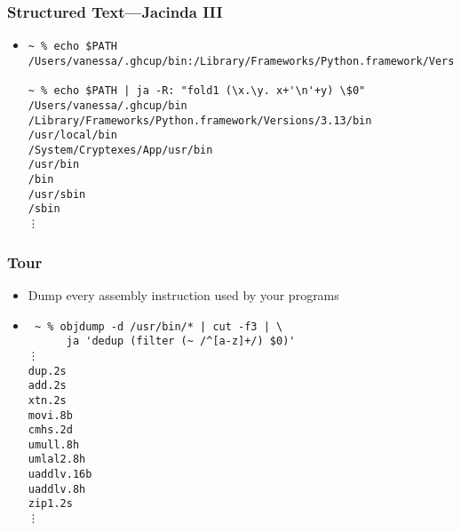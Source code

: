 \documentclass{beamer}
\begin{document}
\begin{frame}[fragile]
  \frametitle{Structured Text---Jacinda III}
  \begin{itemize}
    \item
      \begin{verbatim}
~ % echo $PATH
/Users/vanessa/.ghcup/bin:/Library/Frameworks/Python.framework/Versions/3.13/bin:/Library/Frameworks/Python.framework/Versions/3.12/bin:/Library/Frameworks/Python.framework/Versions/3.11/bin:/Library/Frameworks/Python.framework/Versions/3.10/bin:/usr/local/bin:/System/Cryptexes/App/usr/bin:/usr/bin:/bin:/usr/sbin:/sbin:/var/run/com.apple.security.cryptexd/codex.system/bootstrap/usr/local/bin:/var/run/com.apple.security.cryptexd/codex.system/bootstrap/usr/bin:/var/run/com.apple.security.cryptexd/codex.system/bootstrap/usr/appleinternal/bin:/opt/X11/bin:/Library/TeX/texbin:/usr/local/go/bin:/Users/vanessa/.cpm/bin:/Users/vanessa/pakcs/bin:/Users/vanessa/.local/bin:/Users/vanessa/.cargo/bin:/Applications/iTerm.app/Contents/Resources/utilities:/Applications/CMake.app/Contents/bin:/Users/vanessa/.fzf/bin

~ % echo $PATH | ja -R: "fold1 (\x.\y. x+'\n'+y) \$0"
/Users/vanessa/.ghcup/bin
/Library/Frameworks/Python.framework/Versions/3.13/bin
/usr/local/bin
/System/Cryptexes/App/usr/bin
/usr/bin
/bin
/usr/sbin
/sbin
⋮
      \end{verbatim}
  \end{itemize}
\end{frame}


\begin{frame}[fragile]
  \frametitle{Tour}
  \begin{itemize}
    \item Dump every assembly instruction used by your programs
    \item
      \begin{verbatim}
 ~ % objdump -d /usr/bin/* | cut -f3 | \
      ja 'dedup (filter (~ /^[a-z]+/) $0)'
⋮
dup.2s
add.2s
xtn.2s
movi.8b
cmhs.2d
umull.8h
umlal2.8h
uaddlv.16b
uaddlv.8h
zip1.2s
⋮
      \end{verbatim}
  \end{itemize}
\end{frame}
\end{document}

